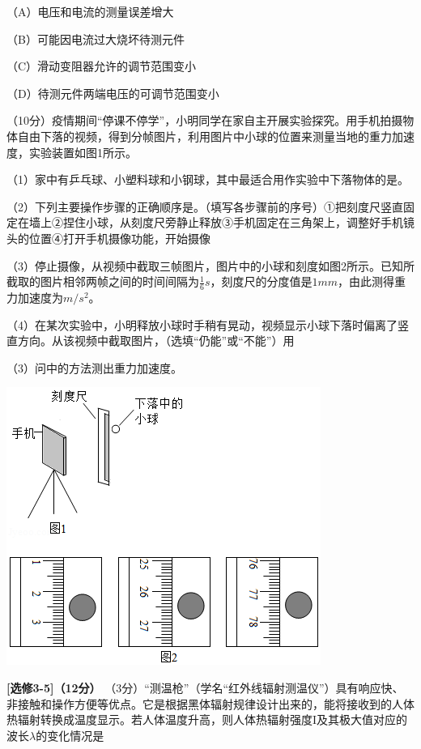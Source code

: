 （A）电压和电流的测量误差增大

（B）可能因电流过大烧坏待测元件

（C）滑动变阻器允许的调节范围变小

（D）待测元件两端电压的可调节范围变小

\newpage
\question[6] （10分）疫情期间“停课不停学”，小明同学在家自主开展实验探究。用手机拍摄物体自由下落的视频，得到分帧图片，利用图片中小球的位置来测量当地的重力加速度，实验装置如图1所示。

（1）家中有乒乓球、小塑料球和小钢球，其中最适合用作实验中下落物体的是。

（2）下列主要操作步骤的正确顺序是。（填写各步骤前的序号）①把刻度尺竖直固定在墙上②捏住小球，从刻度尺旁静止释放③手机固定在三角架上，调整好手机镜头的位置④打开手机摄像功能，开始摄像

（3）停止摄像，从视频中截取三帧图片，图片中的小球和刻度如图2所示。已知所截取的图片相邻两帧之间的时间间隔为$\frac{1}{6}s$，刻度尺的分度值是$1mm$，由此测得重力加速度为$m/s^{2}$。

（4）在某次实验中，小明释放小球时手稍有晃动，视频显示小球下落时偏离了竖直方向。从该视频中截取图片，（选填“仍能”或“不能”）用

（3）问中的方法测出重力加速度。\begin{center}\includegraphics[]{img/image12.png}\end{center}

\newpage
\textbf{[选修3-5]（12分）}
\question[6] （3分）“测温枪”（学名“红外线辐射测温仪”）具有响应快、非接触和操作方便等优点。它是根据黑体辐射规律设计出来的，能将接收到的人体热辐射转换成温度显示。若人体温度升高，则人体热辐射强度I及其极大值对应的波长$\lambda$的变化情况是


